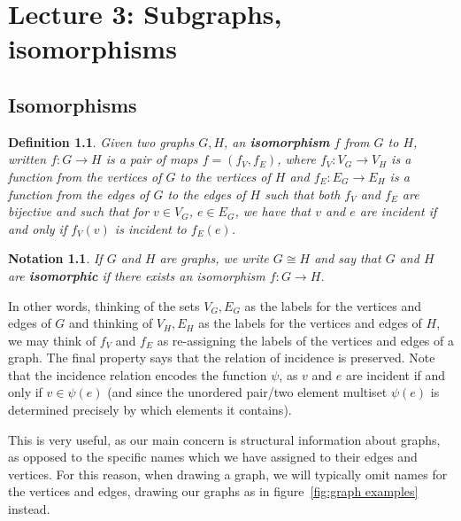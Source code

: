 \documentclass[12pt]{report}
\theoremstyle{plain}
\newtheorem{defn}[thm]{Definition}
\newtheorem{notn}[thm]{Notation}
\newcommand{\Xb}[1]{\textbf{#1}\index{#1}}
\begin{document}
\chapter{Lecture 3: Subgraphs, isomorphisms}

\section{Isomorphisms}

\begin{defn}
Given two graphs $G, H$, an \Xb{isomorphism} $f$ from $G$ to $H$, written
$f: G \to H$ is a pair of maps $f = (f_V, f_E)$, where $f_V: V_G \to V_H$
is a function from the vertices of $G$ to the vertices of $H$ and $f_E: E_G
\to E_H$ is a function from the edges of $G$ to the edges of $H$ such that
both $f_V$ and $f_E$ are bijective and such that for $v \in V_G$, $e \in
E_G$, we have that $v$ and $e$ are incident if and only if $f_V(v)$ is
incident to $f_E(e)$.
\end{defn}

\begin{notn}
If $G$ and $H$ are graphs, we write $G \cong H$ and say that $G$ and $H$
are \textbf{isomorphic} if there exists an
isomorphism $f: G \to H$.
\end{notn}

In other words, thinking of the sets $V_G, E_G$ as the labels for the
vertices and edges of $G$ and thinking of $V_H, E_H$ as the labels for the
vertices and edges of $H$, we may think of $f_V$ and $f_E$ as re-assigning
the labels of the vertices and edges of a graph. The final property says
that the relation of incidence is preserved. Note that the incidence
relation encodes the function $\psi$, as $v$ and $e$ are incident if and
only if $v \in \psi(e)$ (and since the unordered pair/two element multiset
$\psi(e)$ is determined precisely by which elements it contains).

This is very useful, as our main concern is structural information about
graphs, as opposed to the specific names which we have assigned to their
edges and vertices. For this reason, when drawing a graph, we will
typically omit names for the vertices and edges, drawing our graphs as in
figure~\ref{fig:graph examples} instead.
\end{document}
